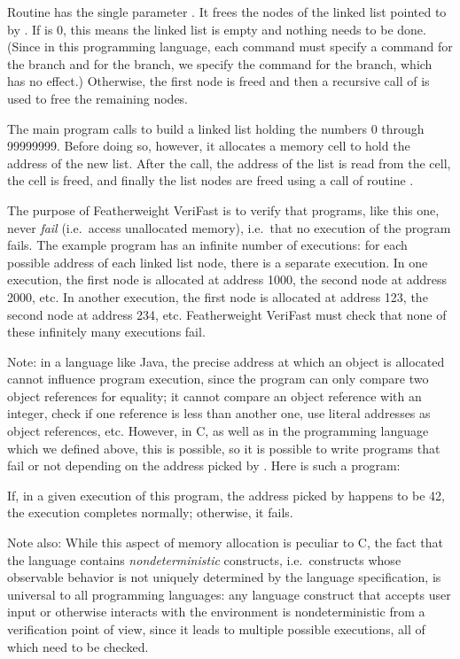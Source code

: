 \documentclass{CSML}
\theoremstyle{definition}\newtheorem{notation}[thm]{Notation}
\theoremstyle{plain}\newtheorem{satz}[thm]{Satz}
\begin{document}
Routine  has the single parameter 
. It frees the nodes of the linked list pointed 
to by . If  is 0, this means the 
linked list is empty and nothing needs to be done. (Since in this programming language, each  command must specify a command for the  branch and for the  branch, we specify the command  for the  branch, which has no effect.) Otherwise, 
the first node is freed and then a recursive call of 
 is used to free the remaining nodes.

The main program calls  to build a linked list 
holding the numbers 0 through 99999999. Before doing so, 
however, it allocates a memory cell to hold the address of the 
new list. After the  call, the address of the 
list is read from the cell, the cell is freed, and finally the 
list nodes are freed using a call of routine 
.

The purpose of Featherweight VeriFast is to verify that 
programs, like this one, never \emph{fail} (i.e.~access 
unallocated memory), i.e.~that no execution of the program 
fails. The example program has an infinite number of 
executions: for each possible address of each linked list node, 
there is a separate execution. In one execution, the first node 
is allocated at address 1000, the second node at address 2000, 
etc. In another execution, the first node is allocated at 
address 123, the second node at address 234, etc. Featherweight 
VeriFast must check that none of these infinitely many 
executions fail. 

Note: in a language like Java, the precise address at which an 
object is allocated cannot influence program execution, since 
the program can only compare two object references for 
equality; it cannot compare an object reference with an 
integer, check if one reference is less than another one, use literal addresses as object references, etc. 
However, in C, as well as in the programming language which we 
defined above, this is possible, so it is possible to write 
programs that fail or not depending on the address picked by 
. Here is such a program:

If, in a given execution of this program, the address picked by  happens to be 42,
the execution completes normally; otherwise, it fails.

Note also: While this aspect of memory allocation is peculiar 
to C, the fact that the language contains 
\emph{nondeterministic} constructs, i.e.~constructs whose 
observable behavior is not uniquely determined by the language 
specification, is universal to all programming languages: any 
language construct that accepts user input or otherwise 
interacts with the environment is nondeterministic from a 
verification point of view, since it leads to multiple possible 
executions, all of which need to be checked.
\end{document}
